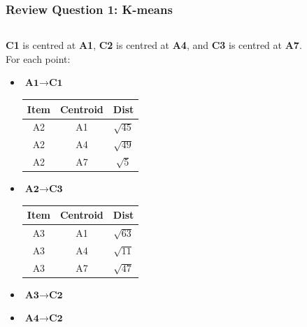 \documentclass[aspectratio=169, 10pt]{beamer}
\begin{document}
\begin{frame}[t]
    \frametitle{Review Question 1: K-means}
    \small
    
    \begin{columns}[]
        \begin{column}{0.5\textwidth} 
            \textbf{C1} is centred at \textbf{A1}, \textbf{C2} is centred at \textbf{A4}, and \textbf{C3} is centred at \textbf{A7}.\\
            For each point:\\
            \begin{itemize}
                \item $\textbf{A1} \rightarrow \textbf{C1}$
                \begin{table}[]
                    \scriptsize
                    \begin{tabular}{ccc}
                    Item & Centroid & Dist \\ \hline
                    A2   & A1       & $\sqrt{45}$ \\
                    A2   & A4       & $\sqrt{49}$ \\
                    A2   & A7       & $\sqrt{5}$
                    \end{tabular}
                \end{table}
                \item $\textbf{A2} \rightarrow \textbf{C3}$
                \begin{table}[]
                    \scriptsize
                    \begin{tabular}{ccc}
                    Item & Centroid & Dist \\ \hline
                    A3   & A1       & $\sqrt{63}$ \\
                    A3   & A4       & $\sqrt{11}$ \\
                    A3   & A7       & $\sqrt{47}$
                    \end{tabular}
                \end{table}
                \item $\textbf{A3} \rightarrow \textbf{C2}$
                \item $\textbf{A4} \rightarrow \textbf{C2}$
            \end{itemize}
        \end{column}
        \begin{column}{0.5\textwidth} 

\end{column}
\end{columns}
\end{frame}
\end{document}
